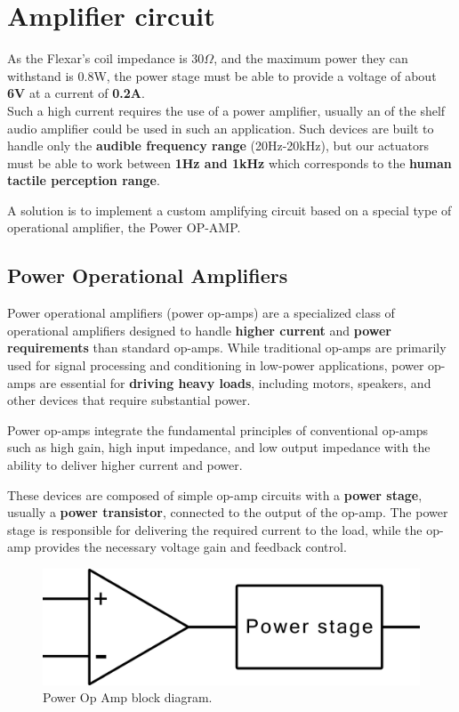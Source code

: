 \section{Amplifier circuit}
As the Flexar's coil impedance is 30$\Omega$, and the maximum power they can withstand is 0.8W, the power stage must be able to provide a voltage of about \textbf{6V} at a current of \textbf{0.2A}. \\
Such a high current requires the use of a power amplifier, usually an of the shelf audio amplifier could be used in such an application.
Such devices are built to handle only the \textbf{audible frequency range} (20Hz-20kHz), but our actuators must be able to work between \textbf{1Hz and 1kHz} which corresponds to the \textbf{human tactile perception range}. 

A solution is to implement a custom amplifying circuit based on a special type of operational amplifier, the Power OP-AMP.

\subsection{Power Operational Amplifiers}
Power operational amplifiers (power op-amps) are a specialized class of operational amplifiers designed to handle \textbf{higher current} and \textbf{power requirements} than standard op-amps.
While traditional op-amps are primarily used for signal processing and conditioning in low-power applications, power op-amps are essential for \textbf{driving heavy loads}, including motors, speakers, and other devices that require substantial power.

Power op-amps integrate the fundamental principles of conventional op-amps such as high gain, high input impedance, and low output impedance with the ability to deliver higher current and power. 

\begin{samepage}
    These devices are composed of simple op-amp circuits with a \textbf{power stage}, usually a \textbf{power transistor}, connected to the output of the op-amp. The power stage is responsible for delivering the required current to the load, while the op-amp provides the necessary voltage gain and feedback control.
    \nopagebreak

    \begin{figure}[H]
        \centering
        \includegraphics[width=0.5\linewidth]{Chapters/Chapter4/Figures/power_op-amp_block_diagram.png}
        \caption{Power Op Amp block diagram.}
        \label{fig:Power_Op_Amp}
    \end{figure}
\end{samepage}


